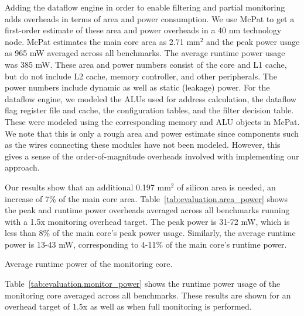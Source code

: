 Adding the dataflow engine in order to enable filtering and partial monitoring adds
overheads in terms of area and power consumption. We use McPat \cite{mcpat-micro09} to get
a first-order estimate of these area and power overheads in a 40 nm technology
node. McPat estimates the main core area as 2.71 mm$^2$ and the peak power usage as
965 mW averaged across all benchmarks. The average runtime power usage was 385 
mW. These area and power numbers consist of the core and
L1 cache, but do not include L2 cache, memory controller, and other
peripherals. The power numbers include dynamic as well as static (leakage)
power. For the dataflow engine, we modeled the ALUs used for address
calculation, the dataflow flag register file and cache, the configuration
tables, and the filter decision table. These were modeled using the
corresponding memory and ALU objects in McPat. We
note that this is only a rough area and power estimate since components such as the
wires connecting these modules have not been modeled. However, this gives a
sense of the order-of-magnitude overheads involved with implementing our
approach.

Our results show that an additional 0.197 mm$^2$ of silicon area is needed, an
increase of 7\% of the main core area. Table~\ref{tab:evaluation.area_power}
shows the peak and runtime power overheads averaged across all benchmarks running with
a 1.5x monitoring overhead target. The peak power is 31-72 mW, which is
less than 8\% of the main core's peak power usage. Similarly, the average runtime power is 13-43
mW, corresponding to 4-11\% of the main core's runtime power.

\begin{table}[tb]
  \begin{center}
    \vspace{-0.0in}
    \begin{footnotesize}
    
    \end{footnotesize}
    \caption{Average runtime power of the monitoring core.}
    \vspace{-0.2in}
    \label{tab:evaluation.monitor_power}
  \end{center}
\end{table}

Table~\ref{tab:evaluation.monitor_power} shows the runtime power usage of the
monitoring core averaged across all benchmarks. These results are shown for an
overhead target of 1.5x as well as when full monitoring is performed.

